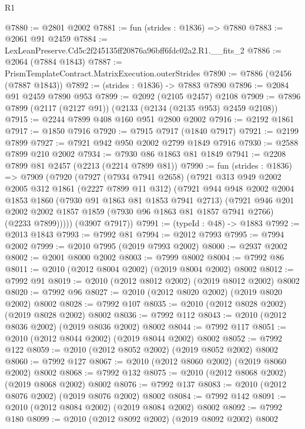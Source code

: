 \begin{lexlean}{R1}
\begin{coremodule}
@7880 := @2801 @2002
@7881 := fun (strides : @1836) => @7880
@7883 := @2061 @91 @2459
@7884 := LexLeanPreserve.Cd5c2f245135ff20876a96bff6fdc02a2.R1.__fits_2
@7886 := @2064 (@7884 @1843)
@7887 := PrismTemplateContract.MatrixExecution.outerStrides
@7890 := @7886 (@2456 (@7887 @1843))
@7892 := (strides : @1836) -> @7883 @7890
@7896 := @2084 @91 @2459 @7890 @953
@7899 := @2092 (@2105 @2457) @2108
@7909 := @7896 @7899 (@2117 (@2127 @91)) (@2133 (@2134 (@2135 @953) @2459 @2108))
@7915 := @2244 @7899 @408 @160 @951 @2800 @2002
@7916 := @2192 @1861
@7917 := @1850 @7916
@7920 := @7915 @7917 (@1840 @7917)
@7921 := @2199 @7899
@7927 := @7921 @942 @950 @2002 @2799 @1849 @7916
@7930 := @2588 @7899 @210 @2002
@7934 := @7930 @86 @1863 @81 @1849
@7941 := @2208 @7899 @81 @2457 (@2213 (@2214 @7899 @81))
@7990 := fun (strides : @1836) =>
  @7909
    (@7920
      (@7927
        (@7934 @7941 @2658)
        (@7921
          @313
          @949
          @2002
          @2005
          @312
          @1861
          (@2227 @7899 @11 @312)
          (@7921
            @944
            @948
            @2002
            @2004
            @1853
            @1860
            (@7930 @91 @1863 @81 @1853 @7941 @2713)
            (@7921
              @946
              @201
              @2002
              @2002
              @1857
              @1859
              (@7930 @96 @1863 @81 @1857 @7941 @2766)
              (@2233 @7899)))))
      (@3907 @7917))
@7991 := (typeId : @48) -> @1883
@7992 := @2013 @1843
@7993 := @7992 @81
@7994 := @2012 @7993
@7995 := @7994 @2002
@7999 := @2010 @7995 (@2019 @7993 @2002)
@8000 := @2937 @2002
@8002 := @2001 @8000 @2002
@8003 := @7999 @8002
@8004 := @7992 @86
@8011 := @2010 (@2012 @8004 @2002) (@2019 @8004 @2002) @8002
@8012 := @7992 @91
@8019 := @2010 (@2012 @8012 @2002) (@2019 @8012 @2002) @8002
@8020 := @7992 @96
@8027 := @2010 (@2012 @8020 @2002) (@2019 @8020 @2002) @8002
@8028 := @7992 @107
@8035 := @2010 (@2012 @8028 @2002) (@2019 @8028 @2002) @8002
@8036 := @7992 @112
@8043 := @2010 (@2012 @8036 @2002) (@2019 @8036 @2002) @8002
@8044 := @7992 @117
@8051 := @2010 (@2012 @8044 @2002) (@2019 @8044 @2002) @8002
@8052 := @7992 @122
@8059 := @2010 (@2012 @8052 @2002) (@2019 @8052 @2002) @8002
@8060 := @7992 @127
@8067 := @2010 (@2012 @8060 @2002) (@2019 @8060 @2002) @8002
@8068 := @7992 @132
@8075 := @2010 (@2012 @8068 @2002) (@2019 @8068 @2002) @8002
@8076 := @7992 @137
@8083 := @2010 (@2012 @8076 @2002) (@2019 @8076 @2002) @8002
@8084 := @7992 @142
@8091 := @2010 (@2012 @8084 @2002) (@2019 @8084 @2002) @8002
@8092 := @7992 @180
@8099 := @2010 (@2012 @8092 @2002) (@2019 @8092 @2002) @8002

\end{coremodule}
\end{lexlean}
